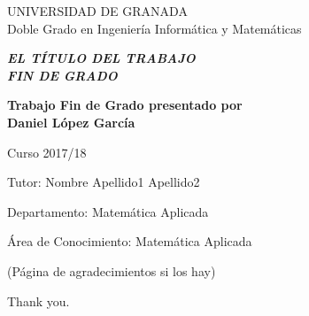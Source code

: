 \quad

\thispagestyle{empty}


\newpage 



\thispagestyle{empty}


\begin{center}

{\Large UNIVERSIDAD DE GRANADA}\\[10mm]
{\Large\sffamily Doble Grado en Ingeniería Informática y Matemáticas}\\[3mm]


\vspace{3cm}


\begin{Large}
{\slshape\bfseries  EL T\'ITULO DEL TRABAJO\\[6mm]
FIN DE GRADO}
\end{Large}

\vspace{3cm}

\vfill

\begin{large}
{\bf Trabajo Fin de Grado presentado por \\[3mm]
Daniel López García}
\end{large}


\vspace{2cm}

\begin{Large}
Curso 2017/18
\end{Large}
\end{center}

\vfill

\noindent
Tutor: Nombre Apellido1 Apellido2

\noindent
Departamento: Matem\'atica Aplicada

\noindent
\'Area de Conocimiento: Matem\'atica Aplicada

\newpage


\thispagestyle{empty}

\quad

\newpage

\thispagestyle{empty}

\vspace*{2cm}

\begin{flushright}
\parbox{3.5in}
{\small
(P\'agina de agradecimientos si los hay)


Thank you.}

\end{flushright}

\newpage

